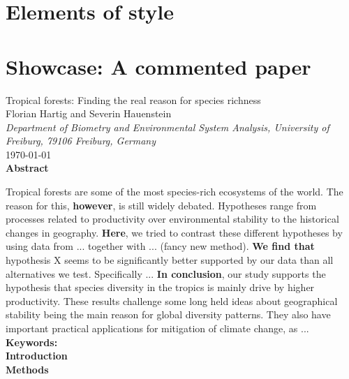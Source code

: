 \documentclass[justified, notoc]{tufte-book} %
\begin{document}
\chapter{Elements of style}


\chapter{Showcase: A commented paper}
\begin{center}
	\huge{Tropical forests: Finding the real reason for species richness} \\
	\vspace{0.3em}
	\large{Florian Hartig and Severin Hauenstein}\\
	\vspace{0.3em}
	\small{\textit{Department of Biometry and Environmental System Analysis, University of Freiburg, 79106 Freiburg, Germany}}\\
	\vspace{1em}
	\large{\today}\\
	\vspace{2em}
	\textbf{Abstract}\\
\end{center}
Tropical forests are some of the most species-rich ecosystems of the world.
The reason for this, \textbf{however}, is still widely debated. Hypotheses range from processes related to productivity over environmental stability to the historical changes in geography.
\textbf{Here}, we tried to contrast these different hypotheses by using data from ... together with ... (fancy new method).
\textbf{We find that} hypothesis X seems to be significantly better supported by our data
than all alternatives we test. Specifically ... 
\textbf{In conclusion}, our study supports the hypothesis that species diversity in the
tropics is mainly drive by higher productivity. These results challenge some long held
ideas about geographical stability being the main reason for global diversity
patterns. They also have important practical applications for mitigation of climate
change, as ...\\
\noindent\textbf{Keywords:}  \\

\noindent\Large{\textbf{Introduction}}\\

\noindent\Large{\textbf{Methods}}\\
\end{document}
